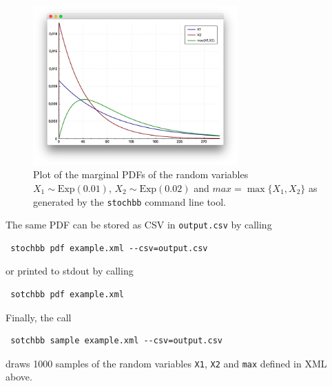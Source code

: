 \documentclass[a4paper, 10pt]{paper}
\newcommand{\code}[1]{\texttt{#1}}
\begin{document}
\begin{figure}
 \centering
  \includegraphics[width=0.7\textwidth]{exampleplot1.png}
  \caption{Plot of the marginal PDFs of the random variables $X_1\sim \text{Exp}(0.01)$, $X_2\sim \text{Exp}(0.02)$ and 
	$max = \max\{X_1,X_2\}$ as generated by the \code{stochbb} command line tool.} \label{fig:exampleplot1}
\end{figure}

The same PDF can be stored as CSV in \code{output.csv} by calling
\begin{lstlisting}
 stochbb pdf example.xml --csv=output.csv
\end{lstlisting}
or printed to stdout by calling 
\begin{lstlisting}
 sotchbb pdf example.xml
\end{lstlisting}

Finally, the call
\begin{lstlisting}
 sotchbb sample example.xml --csv=output.csv
\end{lstlisting}
draws 1000 samples of the random variables \code{X1}, \code{X2} and \code{max} defined in XML above.




\end{document}
